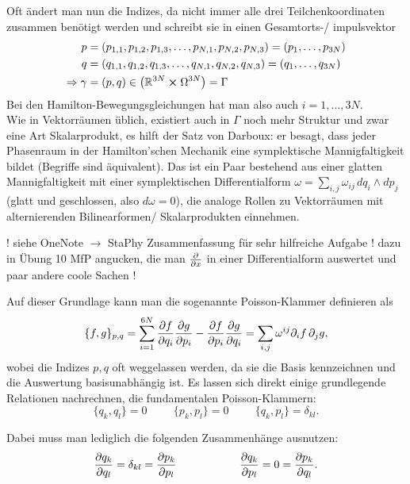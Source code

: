 \documentclass[../KlassMech_main.tex]{subfiles}
\begin{document}
Oft ändert man nun die Indizes, da nicht immer alle drei Teilchenkoordinaten zusammen benötigt werden und schreibt sie in einen Gesamtorts-/ impulsvektor
\begin{align}\label{key}
p &= (p_{1,1}, p_{1,2}, p_{1,3}, \dots, p_{N,1}, p_{N,2}, p_{N,3}) = (p_1, \dots, p_{3N})
\\
q &= (q_{1,1}, q_{1,2}, q_{1,3}, \dots, q_{N,1}, q_{N,2}, q_{N,3}) = (q_1, \dots, q_{3N})
\\
\Rightarrow \gamma &= (p, q) \in \qty(\mathbb{R}^{3N} \cross \Omega^{3N}) = \Gamma
\end{align}
Bei den Hamilton-Bewegungsgleichungen hat man also auch $i = 1, \dots, 3N$.\\

Wie in Vektorräumen üblich, existiert auch in $\Gamma$ noch mehr Struktur und zwar eine Art Skalarprodukt, es hilft der Satz von Darboux: er besagt, dass jeder Phasenraum in der Hamilton'schen Mechanik eine symplektische Mannigfaltigkeit bildet (Begriffe sind äquivalent). Das ist ein Paar bestehend aus einer glatten Mannigfaltigkeit mit einer symplektischen Differentialform $\omega = \sum\limits_{i,j} \omega_{ij} \, dq_i \wedge dp_j$ (glatt und geschlossen, also $d\omega = 0$), die analoge Rollen zu Vektorräumen mit alternierenden Bilinearformen/ Skalarprodukten einnehmen.

! siehe OneNote $\rightarrow$ StaPhy Zusammenfassung für sehr hilfreiche Aufgabe ! dazu in Übung 10 MfP angucken, die man $\pdv{x}$ in einer Differentialform auswertet und paar andere coole Sachen !

Auf dieser Grundlage kann man die sogenannte Poisson-Klammer definieren als
\begin{equation}\label{key}
\{f,g\}_{p,q} = \sum\limits_{i = 1}^{6N} \pdv{f}{q_i} \pdv{g}{p_i} - \pdv{f}{p_i} \pdv{g}{q_i} = \sum\limits_{i,j} \omega^{ij} \partial_i f \, \partial_j g ,
\end{equation}
wobei die Indizes $p,q$ oft weggelassen werden, da sie die Basis kennzeichnen und die Auswertung basisunabhängig ist. Es lassen sich direkt einige grundlegende Relationen nachrechnen, die fundamentalen Poisson-Klammern:
\begin{equation}\label{key}
\{q_k, q_l\} = 0 \hspace{1cm} \{p_k, p_l\} = 0 \hspace{1cm} \{q_k, p_l\} = \delta_{kl} .
\end{equation}

Dabei muss man lediglich die folgenden Zusammenhänge ausnutzen:
\begin{equation}\label{key}
\pdv{q_k}{q_l} = \delta_{kl} = \pdv{p_k}{p_l} \hspace{2cm} \pdv{q_k}{p_l} = 0 = \pdv{p_k}{q_l} .
\end{equation}
\end{document}
